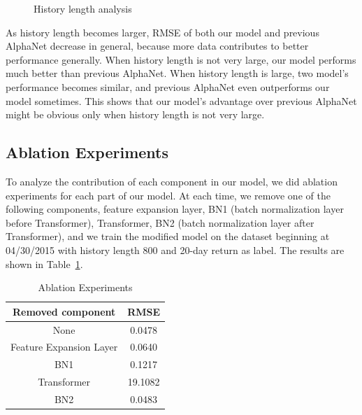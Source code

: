 \documentclass{article}
\begin{document}
\begin{figure}[htbp]
    \caption{History length analysis}
    \label{fig:history_length_analysis}
\end{figure}

\hspace{16}As history length becomes larger, RMSE of both our model and previous AlphaNet decrease in general, because more data contributes to better performance generally. When history length is not very large, our model performs much better than previous AlphaNet. When history length is large, two model's performance becomes similar, and previous AlphaNet even outperforms our model sometimes. This shows that our model's advantage over previous AlphaNet might be obvious only when history length is not very large.

\subsection{Ablation Experiments}
\hspace{16}To analyze the contribution of each component in our model, we did ablation experiments for each part of our model. At each time, we remove one of the following components, feature expansion layer, BN1 (batch normalization layer before Transformer), Transformer, BN2 (batch normalization layer after Transformer), and we train the modified model on the dataset beginning at 04/30/2015 with history length 800 and 20-day return as label. The results are shown in Table~\ref{tab:ablation}.

\begin{table}[htb]
  \centering\small
  \caption{Ablation Experiments}
  \label{tab:ablation}
\begin{tabular}{cc}
    \toprule
    Removed component & RMSE \\
    \midrule
    None & 0.0478 \\
    Feature Expansion Layer & 0.0640 \\
    BN1 & 0.1217 \\
    Transformer & 19.1082 \\
    BN2 & 0.0483 \\
    \bottomrule
  \end{tabular}
\end{table}
\end{document}
